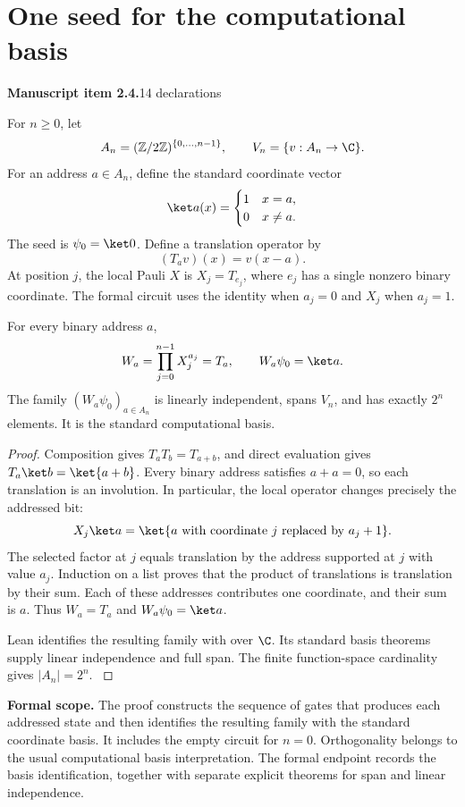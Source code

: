 \section{One seed for the computational basis}\label{supp2:section:001}
\textbf{Manuscript item 2.4.}\quad {}\hfill 14 declarations

For $n\geq 0$, let
\[
 A_n=(\mathbb Z/2\mathbb Z)^{\{0,\ldots,n-1\}},\qquad
 V_n=\{v:A_n\to\C\}.
\]
For an address $a\in A_n$, define the standard coordinate vector
\[
 \ket a(x)=\begin{cases}1&x=a,\\0&x\ne a.\end{cases}
\]
The seed is $\psi_0=\ket0$. Define a translation operator by
\[
 (T_a v)(x)=v(x-a).
\]
At position $j$, the local Pauli $X$ is $X_j=T_{e_j}$, where $e_j$ has a single nonzero binary coordinate. The formal circuit uses the identity when $a_j=0$ and $X_j$ when $a_j=1$.

\begin{statement}\label{supp2:statement:001}
For every binary address $a$,
\[
 W_a=\prod_{j=0}^{n-1}X_j^{a_j}=T_a,
 \qquad W_a\psi_0=\ket a.
\]
The family $(W_a\psi_0)_{a\in A_n}$ is linearly independent, spans $V_n$, and has exactly $2^n$ elements. It is the standard computational basis.
\end{statement}

\begin{proof}\label{supp2:proof:001}
Composition gives $T_aT_b=T_{a+b}$, and direct evaluation gives $T_a\ket b=\ket{a+b}$. Every binary address satisfies $a+a=0$, so each translation is an involution. In particular, the local operator changes precisely the addressed bit:
\[
 X_j\ket a=\ket{a\text{ with coordinate }j\text{ replaced by }a_j+1}.
\]
The selected factor at $j$ equals translation by the address supported at $j$ with value $a_j$. Induction on a list proves that the product of translations is translation by their sum. Each of these addresses contributes one coordinate, and their sum is $a$. Thus $W_a=T_a$ and $W_a\psi_0=\ket a$.

Lean identifies the resulting family with  over $\C$. Its standard basis theorems supply linear independence and full span. The finite function-space cardinality gives $|A_n|=2^n$.
\label{supp2:proof:001:end}\end{proof}

\textbf{Formal scope.} The proof constructs the sequence of gates that produces each addressed state and then identifies the resulting family with the standard coordinate basis. It includes the empty circuit for $n=0$. Orthogonality belongs to the usual computational basis interpretation. The formal endpoint records the basis identification, together with separate explicit theorems for span and linear independence.





